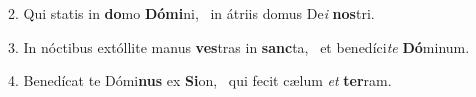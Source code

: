 2. Qui statis in \textbf{do}mo \textbf{Dó}\textbf{mi}ni, \ast\  in átriis domus De\textit{i} \textbf{nos}tri.\

3. In nóctibus extóllite manus \textbf{ves}tras in \textbf{sanc}ta, \ast\  et benedíci\textit{te} \textbf{Dó}minum.\

4. Benedícat te Dómi\textbf{nus} ex \textbf{Si}on, \ast\  qui fecit cælum \textit{et} \textbf{ter}ram.\

